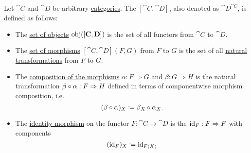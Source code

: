 \begin{definition}\label{def:functor_category}
  Let \( \cat{C} \) and \( \cat{D} \) be arbitrary \hyperref[def:category]{categories}. The  \( [\cat{C}, \cat{D}] \), also denoted as \( \cat{D}^{\cat{C}} \), is defined as follows:

  \begin{itemize}
    \item The \hyperref[def:category/objects]{set of objects} \( \operatorname{obj}([\operatorname{\mathbf{C}}, \operatorname{\mathbf{D}}]) \) is the set of all functors from \( \cat{C} \) to \( \cat{D} \).

    \item The \hyperref[def:category/morphisms]{set of morphisms} \( [\cat{C}, \cat{D}](F, G) \) from \( F \) to \( G \) is the set of all \hyperref[def:natural_transformation]{natural transformations} from \( F \) to \( G \).

    \item The \hyperref[def:category/composition]{composition of the morphisms} \( \alpha: F \Rightarrow G \) and \( \beta: G \Rightarrow H \) is the natural transformation \( \beta \mathbin \circ \alpha: F \Rightarrow H \) defined in terms of componentwise morphism composition, i.e.
    \begin{equation}\label{eq:def:functor_category/composition}
      (\beta \mathbin \circ \alpha)_X \coloneqq \beta_X \mathbin \circ \alpha_X.
    \end{equation}

    \item The \hyperref[def:category/identity]{identity morphism} on the functor \( F: \cat{C} \to \cat{D} \) is the  \( \operatorname{id}_F: F \Rightarrow F \) with components
    \begin{equation}\label{eq:def:functor_category/identity}
      (\operatorname{id}_F)_X \coloneqq \operatorname{id}_{F(X)}
    \end{equation}
  \end{itemize}
\end{definition}
